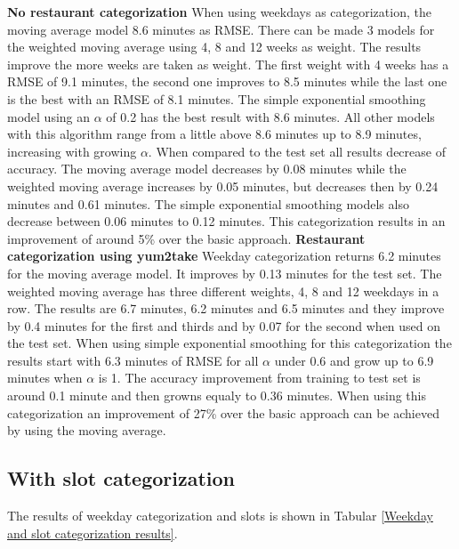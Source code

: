 \newline\newline\textbf{No restaurant categorization}\newline
When using weekdays as categorization, the moving average model 8.6 minutes as RMSE. There can be made 3 models for the weighted moving average using 4, 8 and 12 weeks as weight. The results improve the more weeks are taken as weight. The first weight with 4 weeks has a RMSE of 9.1 minutes, the second one improves to 8.5 minutes while the last one is the best with an RMSE of 8.1 minutes. The simple exponential smoothing model using an $\alpha$ of 0.2 has the best result with 8.6 minutes. All other models with this algorithm range from a little above 8.6 minutes up to 8.9 minutes, increasing with growing $\alpha$. When compared to the test set all results decrease of accuracy. The moving average model decreases by 0.08 minutes while the weighted moving average increases by 0.05 minutes, but decreases then by 0.24 minutes and 0.61 minutes. The simple exponential smoothing models also decrease between 0.06 minutes to 0.12 minutes.\newline
This categorization results in an improvement of around 5\% over the basic approach.
\newline\newline\textbf{Restaurant categorization using yum2take}\newline
Weekday categorization returns 6.2 minutes for the moving average model. It improves by 0.13 minutes for the test set. The weighted moving average has three different weights, 4, 8 and 12 weekdays in a row. The results are 6.7 minutes, 6.2 minutes and 6.5 minutes and they improve by 0.4 minutes for the first and thirds and by 0.07 for the second when used on the test set. When using simple exponential smoothing for this categorization the results start with 6.3 minutes of RMSE for all $\alpha$ under 0.6 and grow up to 6.9 minutes when $\alpha$ is 1. The accuracy improvement from training to test set is around 0.1 minute and then growns equaly to 0.36 minutes.\newline
When using this categorization an improvement of 27\% over the basic approach can be achieved by using the moving average.
\subsection{With slot categorization}
The results of weekday categorization and slots is shown in Tabular \ref{Weekday and slot categorization results}.


